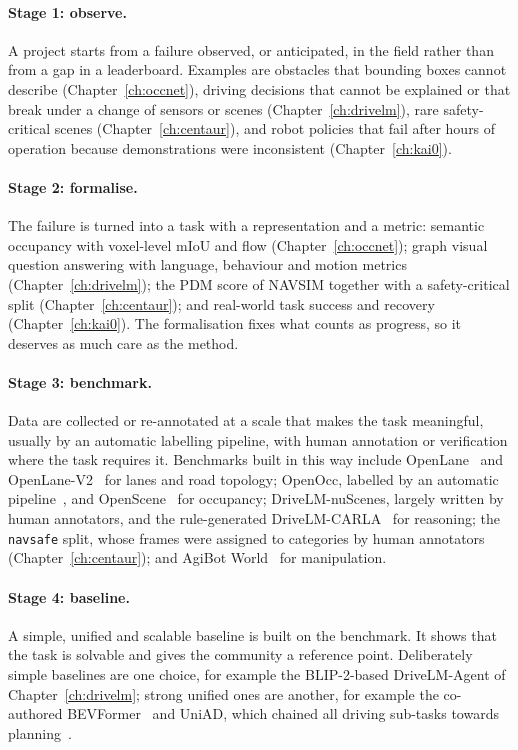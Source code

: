 \paragraph{Stage 1: observe.} A project starts from a failure observed, or anticipated, in the field rather than from a gap in a leaderboard. Examples are obstacles that bounding boxes cannot describe (Chapter~\ref{ch:occnet}), driving decisions that cannot be explained or that break under a change of sensors or scenes (Chapter~\ref{ch:drivelm}), rare safety-critical scenes (Chapter~\ref{ch:centaur}), and robot policies that fail after hours of operation because demonstrations were inconsistent (Chapter~\ref{ch:kai0}).

\paragraph{Stage 2: formalise.} The failure is turned into a task with a representation and a metric: semantic occupancy with voxel-level mIoU and flow (Chapter~\ref{ch:occnet}); graph visual question answering with language, behaviour and motion metrics (Chapter~\ref{ch:drivelm}); the PDM score of NAVSIM together with a safety-critical split (Chapter~\ref{ch:centaur}); and real-world task success and recovery (Chapter~\ref{ch:kai0}). The formalisation fixes what counts as progress, so it deserves as much care as the method.

\paragraph{Stage 3: benchmark.} Data are collected or re-annotated at a scale that makes the task meaningful, usually by an automatic labelling pipeline, with human annotation or verification where the task requires it. Benchmarks built in this way include OpenLane~\cite{chen2022persformer} and OpenLane-V2~\cite{wang2023openlanev2} for lanes and road topology; OpenOcc, labelled by an automatic pipeline~\cite{sima2023occnet}, and OpenScene~\cite{sima2023openscene} for occupancy; DriveLM-nuScenes, largely written by human annotators, and the rule-generated DriveLM-CARLA~\cite{sima2024drivelm} for reasoning; the \texttt{navsafe} split, whose frames were assigned to categories by human annotators (Chapter~\ref{ch:centaur}); and AgiBot World~\cite{bu2025agibot_iros} for manipulation.

\paragraph{Stage 4: baseline.} A simple, unified and scalable baseline is built on the benchmark. It shows that the task is solvable and gives the community a reference point. Deliberately simple baselines are one choice, for example the BLIP-2-based DriveLM-Agent of Chapter~\ref{ch:drivelm}; strong unified ones are another, for example the co-authored BEVFormer~\cite{li2022bevformer} and UniAD, which chained all driving sub-tasks towards planning~\cite{hu2023uniad}.

